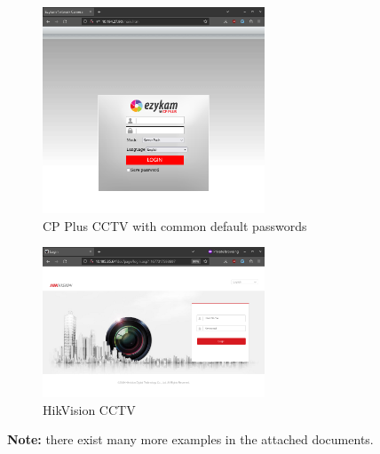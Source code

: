 \documentclass[11pt]{article}
\begin{document}
    \begin{figure}[!htb]
        \centering
        \includegraphics[width=250]{./poc/cp-plus-ezykam}
        \caption{CP Plus CCTV with common default passwords}
        \label{fig:4}
    \end{figure}
    \begin{figure}[!htb]
        \centering
        \includegraphics[width=250]{./poc/hikvision-1}
        \caption{HikVision CCTV}
        \label{fig:5}
    \end{figure}

    \textbf{Note:} there exist many more examples in the attached documents.
\end{document}
